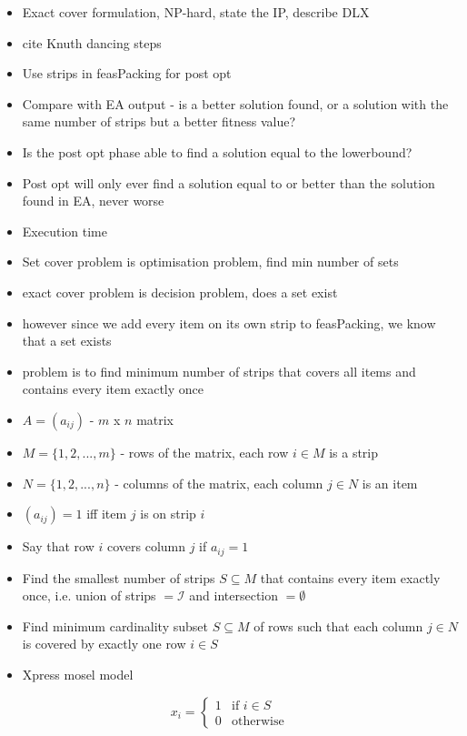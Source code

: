 \documentclass{elsarticle}
\begin{document}
{\color{myGreen}
\begin{itemize}
	\item Exact cover formulation, NP-hard, state the IP, describe DLX
	\item cite Knuth \cite{knuth2000} dancing steps
	\item Use strips in feasPacking for post opt
	\item Compare with EA output - is a better solution found, or a solution with the same number of strips but a better fitness value?
	\item Is the post opt phase able to find a solution equal to the lowerbound?
	\item Post opt will only ever find a solution equal to or better than the solution found in EA, never worse
	\item Execution time
	\item Set cover problem is optimisation problem, find min number of sets
	\item exact cover problem is decision problem, does a set exist
	\item however since we add every item on its own strip to feasPacking, we know that a set exists
	\item problem is to find minimum number of strips that covers all items and contains every item exactly once
	\item $A = (a_{ij})$ - $m$ x $n$ matrix
	\item $M = \{1, 2,..., m\}$ - rows of the matrix, each row $i \in M$ is a strip
	\item $N = \{1, 2,...,n\}$ - columns of the matrix, each column $j \in N$ is an item
	\item $(a_{ij}) = 1$ iff item $j$ is on strip $i$
	\item Say that row $i$ covers column $j$ if $a_{ij} = 1$
	\item Find the smallest number of strips $S \subseteq M$ that contains every item exactly once, i.e. union of strips $= \mathcal{I}$ and intersection $= \emptyset$
	\item Find minimum cardinality subset $S \subseteq M$ of rows such that each column $j \in N$ is covered by exactly one row $i \in S$
	\item Xpress mosel model
\end{itemize}
}

\[x_i =
\begin{cases} 
1 & \text{if } i \in S \\
0 & \text{otherwise} 
\end{cases}
\]
\end{document}
